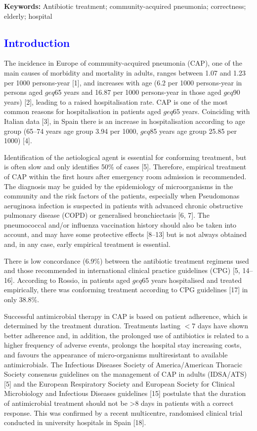 \documentclass[11pt, a4paper]{article}
\begin{document}
{\bf Keywords:} Antibiotic treatment; community-acquired pneumonia; correctness; elderly; hospital

\begin{multicols}{2}
\section*{\textcolor{blue}{Introduction}}
The incidence in Europe of community-acquired pneumonia (CAP), one of the main causes of
morbidity and mortality in adults, ranges between 1.07 and 1.23 per 1000 persons-year [1],
and increases with age (6.2 per 1000 persons-year in persons aged $geq$65 years and 16.87 per 1000 persons-year in those aged $geq$90 years) [2], leading to a raised hospitalisation rate. CAP is one of the most common reasons for hospitalisation in patients aged $geq$65 years. Coinciding with Italian data [3], in Spain there is an increase in hospitalisation according to age group (65–74 years age group 3.94 per 1000, $geq$85 years age group 25.85 per 1000) [4].

Identification of the aetiological agent is essential for conforming treatment, but is often slow and only identifies 50\% of cases [5]. Therefore, empirical treatment of CAP within the first hours after emergency room admission is recommended. The diagnosis may be guided by the epidemiology of microorganisms in the community and the risk factors of the patients, especially when Pseudomonas aeruginosa infection is suspected in patients with advanced chronic obstructive pulmonary disease (COPD) or generalised bronchiectasis [6, 7]. The pneumococcal and/or influenza vaccination history should also be taken into account, and may have some protective effects [8–13] but is not always obtained and, in any case, early empirical treatment is essential.

There is low concordance (6.9\%) between the antibiotic treatment regimens used and those
recommended in international clinical practice guidelines (CPG) [5, 14–16]. According to
Rossio, in patients aged $geq$65 years hospitalised and treated empirically,
there was conforming treatment according to CPG guidelines
[17] in only 38.8\%.

Successful antimicrobial therapy in CAP is based on patient adherence, which is determined by the treatment duration. Treatments lasting $<7$ days have shown better adherence and, in
addition, the prolonged use of antibiotics is related to a higher frequency of adverse events, prolongs the hospital stay increasing costs, and favours the appearance of micro-organisms multiresistant to available antimicrobials. The Infectious Diseases Society of America/American Thoracic Society consensus guidelines on the management of CAP in adults (IDSA/ATS) [5] and the European Respiratory Society and European Society for Clinical
Microbiology and Infectious Diseases guidelines [15] postulate that the duration of antimicrobial treatment should not be >8 days in patients with a correct response. This was confirmed by a recent multicentre, randomised clinical trial conducted in university
hospitals in Spain [18].


\end{multicols}
\end{document}

